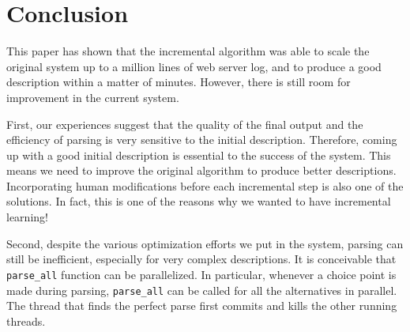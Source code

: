 \section{Conclusion}
\label{sec:conclude}
This paper has shown that the incremental 
algorithm was able to scale the original
\learnpads{} system up to a million
lines of web server log, and to produce a good
description within a matter of minutes.
However, there is still room for improvement in the
current system. 

First, our experiences suggest that
the quality of the final output and the efficiency
of parsing is very sensitive to the initial
description. Therefore, coming up with a good
initial description is essential to the success
of the system. This means we need to improve the
original \learnpads{} algorithm to produce better
descriptions.
Incorporating human modifications 
before each incremental step is also one of the solutions.
In fact, this is one of the reasons why we wanted to
have incremental learning!


Second, despite the various optimization efforts we put in
the system, parsing can still be inefficient, 
especially for very complex descriptions.
It is conceivable that 
{\tt parse\_all} function can be parallelized. In
particular, whenever a choice point is made during
parsing, {\tt parse\_all}
can be called for all the alternatives in
parallel. The thread that finds the perfect
parse first commits and kills the other running threads.
 

